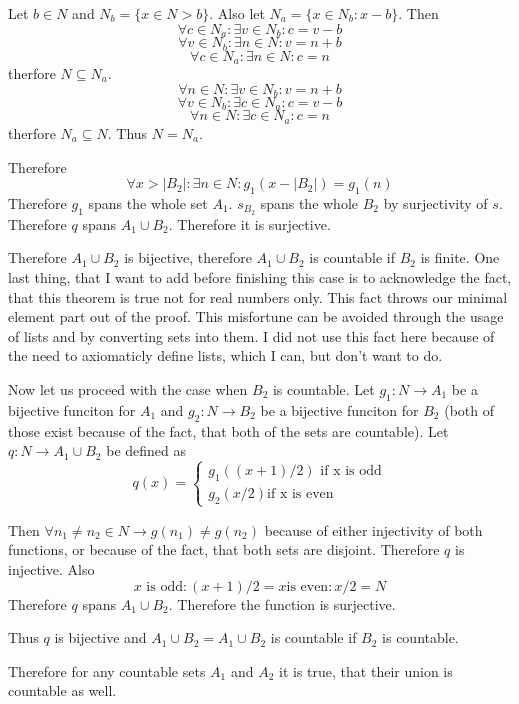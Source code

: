 \documentclass[11pt,oneside,titlepage]{book}
\begin{document}
Let $b \in N$ and  $N_b = \{x \in N > b\}$. Also let  $N_a = \{x \in N_b: x -
b\}$. Then
$$\forall c \in N_a: \exists v \in N_b: c = v - b$$
$$\forall v \in N_b: \exists n \in N: v = n + b$$
$$\forall c \in N_a: \exists n \in N: c = n$$
therfore $N \subseteq N_a$.
$$\forall n \in N: \exists v \in N_b: v = n + b$$
$$\forall v \in N_b: \exists c \in N_a: c = v - b$$
$$\forall n \in N: \exists c \in N_a: c = n$$
therfore $N_a \subseteq N$. Thus $N = N_a$.

Therefore
$$\forall x > |B_2|: \exists n \in N: g_1(x - |B_2|) = g_1(n)$$
Therefore $g_1$ spans the whole set $A_1$. $s_{B_2}$ spans the whole $B_2$ by
surjectivity of $s$. Therefore $q$ spans $A_1 \cup B_2$. Therefore it
is surjective.

Therefore $A_1 \cup B_2$ is bijective, therefore $A_1 \cup B_2$ is countable
if $B_2$ is finite. One last thing, that I want to add before finishing this case
is to acknowledge the fact, that this theorem is  true not for
real numbers only. This fact throws our minimal element part out of  the proof.
This misfortune can be avoided through the usage of lists and by converting sets
into them. I did not use this fact here because of the need to axiomaticly
define lists, which I can, but don't want to do. 

Now let us proceed with the case when $B_2$ is countable. Let
$g_1: N \to A_1$ be a bijective funciton for $A_1$
and $g_2: N \to B_2$ be a bijective funciton
for $B_2$ (both of those exist because of the fact, that both of the sets are
countable).  Let $q: N \to A_1 \cup B_2$ be defined as
\begin{equation}
  q(x) =
  \begin{cases}
    g_1((x + 1) /  2) \text{ if x is odd} \\
    g_2(x / 2) \text{if x is even}
  \end{cases}
\end{equation}

Then $\forall n_1 \neq n_2 \in N \to g(n_1) \neq g(n_2)$ because of either
injectivity of both functions, or because of the fact, that both sets are
disjoint. Therefore $q$ is injective. Also
$${x \text{ is odd}: (x + 1) / 2} = {x \text{is even}: x/2 } = N$$
Therefore $q$ spans $A_1 \cup B_2$. Therefore the function is surjective.

Thus $q$ is bijective and $A_1 \cup B_2 = A_1 \cup B_2$ is countable if
$B_2$ is countable.

Therefore for any countable sets $A_1$ and $A_2$ it is true, that their
union is countable as well.
\end{document}
